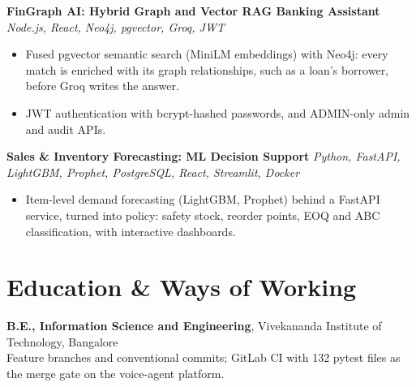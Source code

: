 \documentclass[10pt,a4paper]{article}
\begin{document}
\vspace{2pt}
\textbf{FinGraph AI: Hybrid Graph and Vector RAG Banking Assistant} \textit{Node.js, React, Neo4j, pgvector, Groq, JWT}
\begin{itemize}
  \item Fused pgvector semantic search (MiniLM embeddings) with Neo4j: every match is enriched with its
        graph relationships, such as a loan's borrower, before Groq writes the answer.
  \item JWT authentication with bcrypt-hashed passwords, and ADMIN-only admin and audit APIs.
\end{itemize}

\vspace{2pt}
\textbf{Sales \& Inventory Forecasting: ML Decision Support} \textit{Python, FastAPI, LightGBM, Prophet, PostgreSQL, React, Streamlit, Docker}
\begin{itemize}
  \item Item-level demand forecasting (LightGBM, Prophet) behind a FastAPI service, turned into policy:
        safety stock, reorder points, EOQ and ABC classification, with interactive dashboards.
\end{itemize}
\section{Education \& Ways of Working}
\textbf{B.E., Information Science and Engineering}, Vivekananda Institute of Technology, Bangalore\\
Feature branches and conventional commits; GitLab CI with 132 pytest files as the merge gate on the
voice-agent platform.
\end{document}
